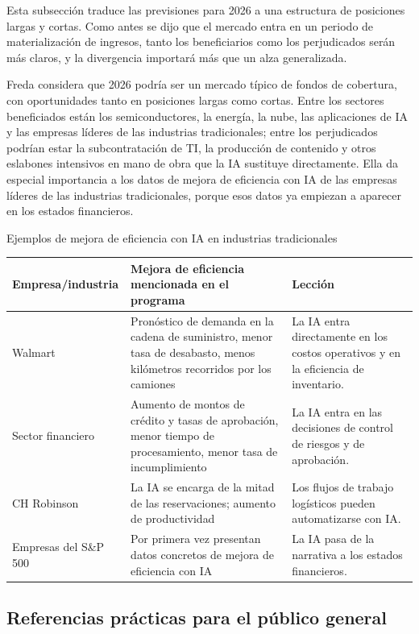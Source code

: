 \documentclass[a4paper]{article}
\begin{document}
Esta subsección traduce las previsiones para 2026 a una estructura de posiciones largas y cortas. Como antes se dijo que el mercado entra en un periodo de materialización de ingresos, tanto los beneficiarios como los perjudicados serán más claros, y la divergencia importará más que un alza generalizada.

Freda considera que 2026 podría ser un mercado típico de fondos de cobertura, con oportunidades tanto en posiciones largas como cortas. Entre los sectores beneficiados están los semiconductores, la energía, la nube, las aplicaciones de IA y las empresas líderes de las industrias tradicionales; entre los perjudicados podrían estar la subcontratación de TI, la producción de contenido y otros eslabones intensivos en mano de obra que la IA sustituye directamente. Ella da especial importancia a los datos de mejora de eficiencia con IA de las empresas líderes de las industrias tradicionales, porque esos datos ya empiezan a aparecer en los estados financieros.

\begin{knowledgebox}{Ejemplos de mejora de eficiencia con IA en industrias tradicionales}
\begin{tabularx}{\textwidth}{p{}p{}X}
\toprule
Empresa/industria & Mejora de eficiencia mencionada en el programa & Lección \\
\midrule
Walmart & Pronóstico de demanda en la cadena de suministro, menor tasa de desabasto, menos kilómetros recorridos por los camiones & La IA entra directamente en los costos operativos y en la eficiencia de inventario. \\
Sector financiero & Aumento de montos de crédito y tasas de aprobación, menor tiempo de procesamiento, menor tasa de incumplimiento & La IA entra en las decisiones de control de riesgos y de aprobación. \\
CH Robinson & La IA se encarga de la mitad de las reservaciones; aumento de productividad & Los flujos de trabajo logísticos pueden automatizarse con IA. \\
Empresas del S\&P 500 & Por primera vez presentan datos concretos de mejora de eficiencia con IA & La IA pasa de la narrativa a los estados financieros. \\
\bottomrule
\end{tabularx}
\end{knowledgebox}

\subsection{Referencias prácticas para el público general}
\end{document}
